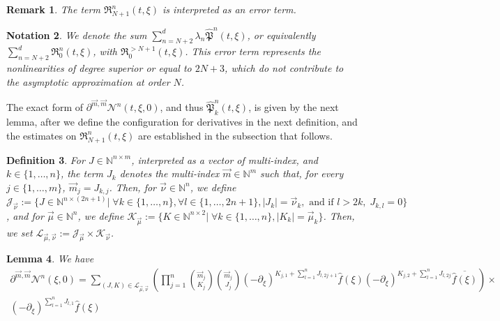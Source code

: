 \documentclass[a4paper, 15pt]{article}
\numberwithin{equation}{section}
\newtheorem{defi}{Definition}[section]
\newtheorem{rem}[defi]{Remark}
\newtheorem{lem}[defi]{Lemma}
\newtheorem{nota}[defi]{Notation}
\begin{document}
\begin{rem}
The term $\mathfrak{R}^n_{N+1}(t,\xi)$ is interpreted as an error term. \\
\end{rem} 
\begin{nota}
\label{nota:sumtoterror}
We denote the sum $\sum_{n=N+2}^{d}\lambda_n\hat{\mathfrak{P}}^n(t,\xi)$, or equivalently $\sum_{n=N+2}^{d}\mathfrak{R}^n_{0}(t,\xi)$, with $\mathfrak{R}^{> N+1}_0(t,\xi)$. This error term represents the nonlinearities of degree superior or equal to $2N+3$, which do not contribute to the asymptotic approximation at order $N$. \\
\end{nota}
The exact form of $\partial^{\overrightarrow{m},\overrightarrow{m}}\mathcal{N}^n(t,\xi,0)$, and thus $\hat{\mathfrak{P}}^n_k(t,\xi)$, is given by the next lemma, after we define the configuration for derivatives in the next definition, and the estimates on $\mathfrak{R}^n_{N+1}(t,\xi)$ are established in the subsection that follows. \\
\begin{defi}
\label{defi:config}
For $J\in\mathbb{N}^{n\times m}$, interpreted as a vector of multi-index, and $k\in\{1,\dots,n\}$, the term $J_k$ denotes the multi-index $\overrightarrow{m}\in\mathbb{N}^{m}$ such that, for every $j\in\{1,\dots,m\}$, $\overrightarrow{m}_j=J_{k,j}$.
Then, for $\overrightarrow{\nu}\in\mathbb{N}^n$, we define $\mathscr{J}_{\overrightarrow{\nu}}:=\{J\in\mathbb{N}^{n\times(2n+1)}|\;\forall k\in\{1,\dots,n\},\forall l\in\{1,\dots,2n+1\}, |J_k|=\overrightarrow{\nu}_k,\text{ and if }l> 2k,\;  J_{k,l}=0\}$, and for $\overrightarrow{\mu}\in\mathbb{N}^n$, we define $\mathscr{K}_{\overrightarrow{\mu}}:=\{K\in\mathbb{N}^{n\times 2}|\;\forall k\in\{1,\dots,n\}, |K_k|=\overrightarrow{\mu}_k\}$. Then, we set $\mathscr{L}_{\overrightarrow{\mu},\overrightarrow{\nu}}:=\mathscr{J}_{\overrightarrow{\mu}}\times\mathscr{K}_{\overrightarrow{\nu}}$.\\
\end{defi}
\begin{lem}
\label{lem:exactformN}
We have
\begin{multline}
    \partial^{\overrightarrow{m},\overrightarrow{m}}\mathcal{N}^n(\xi,0)=\sum_{(J,K)\in\mathscr{L}_{\overrightarrow{\mu},\overrightarrow{\nu}}}\left(\prod^n_{j=1}\binom{\overrightarrow{m}_j}{K_j}\binom{\overrightarrow{m}_j}{J_j}(-\partial_\xi)^{K_{j,1}+\sum_{l=1}^{n}J_{l,2j+1}}\hat{f}(\xi)(-\partial_\xi)^{K_{j,2}+\sum_{l=1}^{n}J_{l,2j}}\overline{\hat{f}(\xi)}\right)\times\\(-\partial_\xi)^{\sum_{l=1}^{n}J_{l,1}}\hat{f}(\xi)
\end{multline}
\end{lem}
\end{document}
